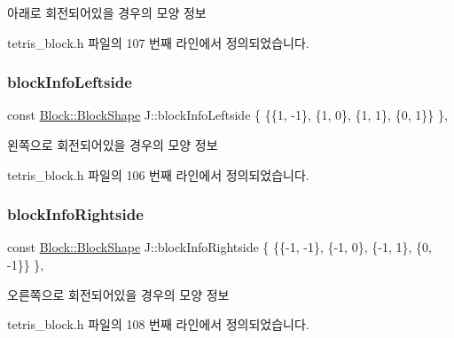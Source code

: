 아래로 회전되어있을 경우의 모양 정보 



tetris\+\_\+block.\+h 파일의 107 번째 라인에서 정의되었습니다.

\mbox{\label{class_j_a3772ed06ecd269c9bb646acb32ba1e57}} 
\subsubsection{\texorpdfstring{block\+Info\+Leftside}{blockInfoLeftside}}
{\footnotesize\ttfamily const \mbox{\hyperlink{class_block_aca5d951639f113e2ebd7856209d6b9ab}{Block\+::\+Block\+Shape}} J\+::block\+Info\+Leftside \{ \{\{1, -\/1\}, \{1, 0\}, \{1, 1\}, \{0, 1\}\} \}\hspace{0.3cm}{\ttfamily [static]}, {\ttfamily [private]}}



왼쪽으로 회전되어있을 경우의 모양 정보 



tetris\+\_\+block.\+h 파일의 106 번째 라인에서 정의되었습니다.

\mbox{\label{class_j_a412d1f5ebc3078b09d5568c16c741a25}} 
\subsubsection{\texorpdfstring{block\+Info\+Rightside}{blockInfoRightside}}
{\footnotesize\ttfamily const \mbox{\hyperlink{class_block_aca5d951639f113e2ebd7856209d6b9ab}{Block\+::\+Block\+Shape}} J\+::block\+Info\+Rightside \{ \{\{-\/1, -\/1\}, \{-\/1, 0\}, \{-\/1, 1\}, \{0, -\/1\}\} \}\hspace{0.3cm}{\ttfamily [static]}, {\ttfamily [private]}}



오른쪽으로 회전되어있을 경우의 모양 정보 



tetris\+\_\+block.\+h 파일의 108 번째 라인에서 정의되었습니다.

\mbox{\label{class_j_ab2d6ad0a92ed645027ee423bb4ff660b}} 
